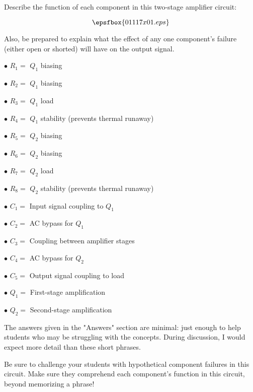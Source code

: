 

Describe the function of each component in this two-stage amplifier circuit:

$$\epsfbox{01117x01.eps}$$

Also, be prepared to explain what the effect of any one component's failure (either open or shorted) will have on the output signal.







\medskip
\item{$\bullet$} $R_1 = $ $Q_1$ biasing
\item{$\bullet$} $R_2 = $ $Q_1$ biasing 
\item{$\bullet$} $R_3 = $ $Q_1$ load
\item{$\bullet$} $R_4 = $ $Q_1$ stability (prevents thermal runaway)
\item{$\bullet$} $R_5 = $ $Q_2$ biasing
\item{$\bullet$} $R_6 = $ $Q_2$ biasing
\item{$\bullet$} $R_7 = $ $Q_2$ load
\item{$\bullet$} $R_8 = $ $Q_2$ stability (prevents thermal runaway)
\medskip

\medskip
\item{$\bullet$} $C_1 = $ Input signal coupling to $Q_1$
\item{$\bullet$} $C_2 = $ AC bypass for $Q_1$
\item{$\bullet$} $C_3 = $ Coupling between amplifier stages
\item{$\bullet$} $C_4 = $ AC bypass for $Q_2$
\item{$\bullet$} $C_5 = $ Output signal coupling to load
\medskip

\medskip
\item{$\bullet$} $Q_1 = $ First-stage amplification
\item{$\bullet$} $Q_2 = $ Second-stage amplification
\medskip







The answers given in the "Answers" section are minimal: just enough to help students who may be struggling with the concepts.  During discussion, I would expect more detail than these short phrases.

Be sure to challenge your students with hypothetical component failures in this circuit.  Make sure they comprehend each component's function in this circuit, beyond memorizing a phrase!




